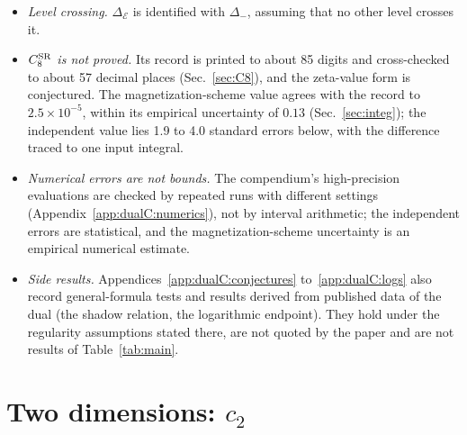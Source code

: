 \documentclass[11pt,a4paper]{article}
\numberwithin{equation}{section}
\newcommand{\De}{\Delta_{\mathcal E}}
\newcommand{\Ds}{\Delta_\sigma}
\newcommand{\CSR}{C^{\rm SR}}
\newcommand{\sci}[2]{#1\times10^{#2}}
\begin{document}
\begin{itemize}
 paper~\cite{Paper,NRGnote} does not use the dual. At $\Ds=0.01$, the residual of its $\De$ after each added order
 of the series is $\sci{4.7}{-3}$, $\sci{9.8}{-4}$, $\sci{2.4}{-4}$ and $\sci{5.3}{-5}$ through $\CSR_2$ to $\CSR_5$;
 the NRG error there is $\sci{4.7}{-5}$ (a linear sum of chain-depth, truncation and discretization parts, not a
 standard deviation), so the last residual is 1.1 times that error. The test is of the partial sums, and with them of
 $\CSR_3$ to $\CSR_5$; the term of $\CSR_6$ ($\sci{5.9}{-5}$) is of the size of the NRG error, and the higher terms
 are below it.
\item \emph{Level crossing.} $\De$ is identified with $\Delta_-$, assuming that no other level crosses it.
\item \emph{$\CSR_8$ is not proved.} Its record is printed to about 85 digits and cross-checked to about 57 decimal
 places (Sec.~\ref{sec:C8}), and the zeta-value form is conjectured. The magnetization-scheme value agrees with the
 record to $\sci{2.5}{-5}$, within its empirical uncertainty of $0.13$ (Sec.~\ref{sec:integ}); the independent value
 lies 1.9 to 4.0 standard errors below, with the difference traced to one input integral.
\item \emph{Numerical errors are not bounds.} The compendium's high-precision evaluations are checked by repeated runs
 with different settings (Appendix~\ref{app:dualC:numerics}), not by interval arithmetic; the independent errors are statistical, and the
 magnetization-scheme uncertainty is an empirical numerical estimate.
\item \emph{Side results.} Appendices~\ref{app:dualC:conjectures} to~\ref{app:dualC:logs} also record general-formula
 tests and results derived from published data of the dual (the shadow relation, the logarithmic endpoint). They hold
 under the regularity assumptions stated there, are not quoted by the paper and are not results of Table~\ref{tab:main}.
\end{itemize}

\section{Two dimensions: \texorpdfstring{$c_2$}{c2}}\label{sec:d2}
\end{document}
